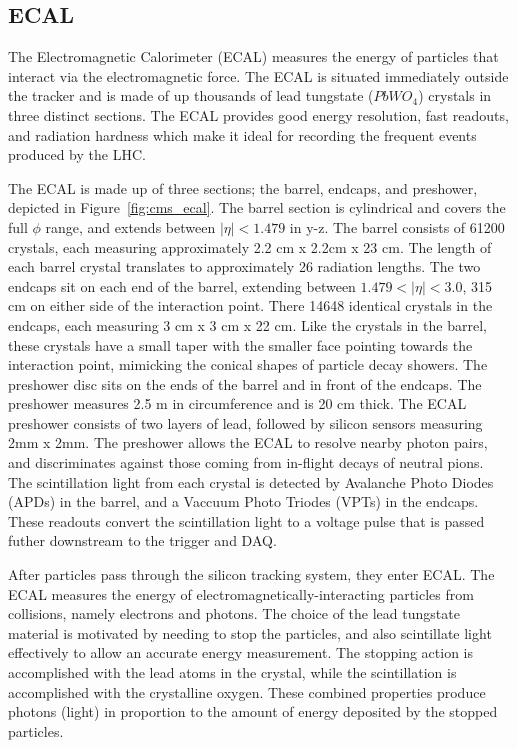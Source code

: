 \subsection{ECAL}
The Electromagnetic Calorimeter (ECAL) measures the energy of particles that interact via the electromagnetic force. The ECAL is situated immediately outside the tracker
and is made of up thousands of lead tungstate ($PbWO_{4}$) crystals in three distinct sections. The ECAL provides good energy resolution, fast readouts, and radiation hardness
which make it ideal for recording the frequent events produced by the LHC. 

The ECAL is made up of three sections; the barrel, endcaps, and preshower, depicted in Figure~\ref{fig:cms_ecal}. The barrel section is cylindrical and covers the full $\phi$
range, and extends between $|\eta| < 1.479$ in y-z. The barrel consists of 61200 crystals, each measuring approximately 2.2 cm x 2.2cm x 23 cm. The length of each barrel
crystal translates to approximately 26 radiation lengths. The two endcaps sit on each end of the barrel, extending between $1.479 < |\eta|< 3.0$, 315 cm on either side of
the interaction point. There 14648 identical crystals in the endcaps, each measuring 3 cm x 3 cm x 22 cm. Like the crystals in the barrel, these crystals have a small taper
with the smaller face pointing towards the interaction point, mimicking the conical shapes of particle decay showers.
The preshower disc sits on the ends of the barrel and in front of the endcaps. The preshower measures 2.5 m in circumference and is 20 cm thick. The ECAL preshower consists of two layers
of lead, followed by silicon sensors measuring 2mm x 2mm. The preshower allows the ECAL to resolve nearby photon pairs, and discriminates against those coming from in-flight decays
of neutral pions. The scintillation light from each crystal is detected by Avalanche Photo Diodes (APDs) in the barrel, and a Vaccuum Photo Triodes (VPTs) in the endcaps.
These readouts convert the scintillation light to a voltage pulse that is passed futher downstream to the trigger and DAQ. 

After particles pass through the silicon tracking system, they enter ECAL. The ECAL measures the energy of electromagnetically-interacting particles from collisions, namely electrons and photons.
The choice of the lead tungstate material is motivated by needing to stop the particles, and also scintillate light effectively to allow an accurate energy measurement.
The stopping action is accomplished with the lead atoms in the crystal, while the scintillation is accomplished with
the crystalline oxygen. These combined properties produce photons (light) in proportion to the amount of energy deposited by the stopped particles.

